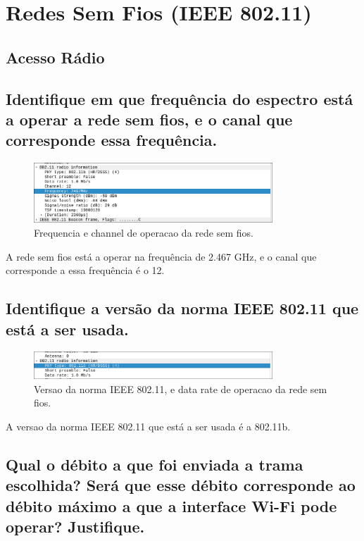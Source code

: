 \documentclass{article}
\begin{document}
\section{Redes Sem Fios (IEEE 802.11)}
\subsection*{Acesso Rádio}
\subsection{Identifique em que frequência do espectro está a operar a rede sem fios, e o canal que corresponde essa frequência.}

\begin{figure}[h]
    \centering
    \includegraphics[width=0.8\textwidth]{freq.png}
    \caption{\label{fig:freq}Frequencia e channel de operacao da rede sem fios.}
\end{figure}

A rede sem fios está a operar na frequência de 2.467 GHz, e o canal que corresponde a essa frequência é o 12.

\subsection{Identifique a versão da norma IEEE 802.11 que está a ser usada.}

\begin{figure}[h]
    \centering
    \includegraphics[width=0.8\textwidth]{ver.png}
    \caption{\label{fig:ver}Versao da norma IEEE 802.11, e data rate de operacao da rede sem fios.}
\end{figure}

A versao da norma IEEE 802.11 que está a ser usada é a 802.11b.

\subsection{Qual o débito a que foi enviada a trama escolhida? Será que esse débito  corresponde ao débito máximo a que a interface Wi-Fi pode operar? Justifique.}
\end{document}
